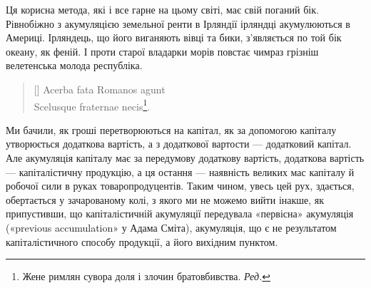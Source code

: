 Ця корисна метода, які і все гарне на цьому світі, має свій
поганий бік. Рівнобіжно з акумуляцією земельної ренти в Ірляндії
ірляндці акумулюються в Америці. Ірляндець, що його виганяють
вівці та бики, з’являється по той бік океану, як феній.
І проти старої владарки морів повстає чимраз грізніш велетенська
молода республіка.

\settowidth{\versewidth}{Scelusque fraternae necis.}
\begin{verse}[\versewidth]
Acerba fata Romanos agunt \\
Scelusque fraternae necis\footnote*{
Жене римлян сувора доля і злочин братовбивства. \emph{Ред.}
}.
\end{verse}


Ми бачили, як гроші перетворюються на капітал, як за допомогою
капіталу утворюється додаткова вартість, а з додаткової
вартости — додатковий капітал. Але акумуляція капіталу має за
передумову додаткову вартість, додаткова вартість — капіталістичну
продукцію, а ця остання — наявність великих мас капіталу
й робочої сили в руках товаропродуцентів. Таким чином,
увесь цей рух, здається, обертається у зачарованому колі, з
якого ми не можемо вийти інакше, як припустивши, що капіталістичній
акумуляції передувала «первісна» акумуляція («previous
accumulation» у Адама Сміта), акумуляція, що є не результатом
капіталістичного способу продукції, а його вихідним пунктом.

